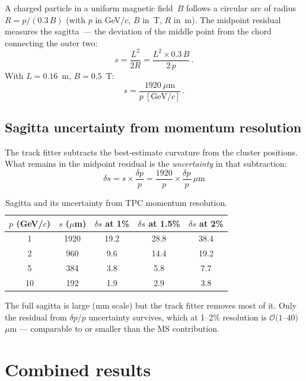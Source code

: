 \documentclass[11pt,a4paper]{article}
\begin{document}
A charged particle in a uniform magnetic field~$B$ follows a circular
arc of radius $R = p/(0.3\,B)$ (with $p$ in GeV/$c$, $B$ in~T, $R$
in~m).  The midpoint residual measures the sagitta~--- the deviation of
the middle point from the chord connecting the outer two:
\begin{equation}
s = \frac{L^2}{2R} = \frac{L^2 \times 0.3\,B}{2\,p}\,.
\end{equation}
With $L = 0.16$~m, $B = 0.5$~T:
\begin{equation}
s = \frac{1920~\mu\mathrm{m}}{p~[\mathrm{GeV}/c]}\,.
\end{equation}

\subsection{Sagitta uncertainty from momentum resolution}

The track fitter subtracts the best-estimate curvature from the cluster
positions.  What remains in the midpoint residual is the \emph{uncertainty}
in that subtraction:
\begin{equation}
\boxed{
\delta s = s \times \frac{\delta p}{p}
= \frac{1920}{p}\times\frac{\delta p}{p}~\mu\mathrm{m}
}
\end{equation}

\begin{table}[h]
\centering
\caption{Sagitta and its uncertainty from TPC momentum resolution.}
\label{tab:sagitta}
\begin{tabular}{ccccc}
\toprule
$p$ (GeV/$c$) & $s$ ($\mu$m) & $\delta s$ at 1\% & $\delta s$ at 1.5\% & $\delta s$ at 2\% \\
\midrule
1  & 1920 & 19.2 & 28.8 & 38.4 \\
2  &  960 &  9.6 & 14.4 & 19.2 \\
5  &  384 &  3.8 &  5.8 &  7.7 \\
10 &  192 &  1.9 &  2.9 &  3.8 \\
\bottomrule
\end{tabular}
\end{table}

\noindent
The full sagitta is large (mm scale) but the track fitter removes most
of it.  Only the residual from $\delta p/p$ uncertainty survives, which
at 1--2\% resolution is $\mathcal{O}(1$--$40)$~$\mu$m --- comparable to
or smaller than the MS contribution.

\section{Combined results}
\end{document}
